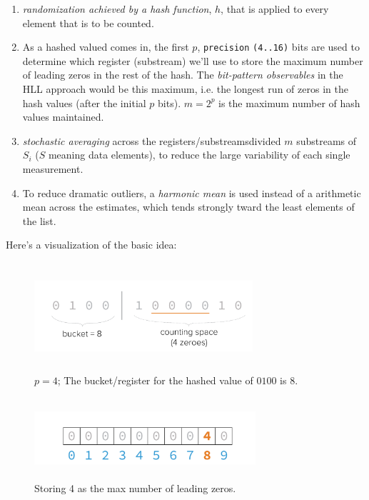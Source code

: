 \documentclass[12pt]{article}
\begin{document}
\begin{enumerate}
\item \textit{randomization achieved by a hash function}, $h$, that is applied
  to every element that is to be counted.
\item As a hashed valued comes in, the first $p$, \texttt{precision}
  \texttt{(4..16)} bits are used to determine which register (substream)
  we'll use to store the maximum number of leading zeros in the rest of the
  hash. The \textit{bit-pattern observables} in the HLL approach would be this
  maximum, i.e. the longest run of zeros in the hash values (after the initial
  $p$ bits). $m = 2^p$ is the maximum number of hash values maintained.
\item \textit{stochastic averaging} across the
  registers/substreams\textemdash divided $m$ substreams of $S_i$
  ($S$ meaning data elements), to reduce the large variability of each single
  measurement.
\item To reduce dramatic outliers, a \textit{harmonic mean} is used instead of
  a arithmetic mean across the estimates, which tends strongly tward the least
  elements of the list\cite{Harmonic-mean:Online}.
\end{enumerate}

Here's a visualization of the basic idea\cite{Kiip:Online}:

\begin{figure}[H]
\centering
\includegraphics[width=8.1cm, height=4cm]{bucket-run}
\caption{$p=4$; The bucket/register for the hashed value of $0100$ is $8$.}
\label{figurebucketrun}
\end{figure}

\begin{figure}[H]
\centering
\includegraphics[width=8.2cm, height=3cm]{register-store}
\caption{Storing 4 as the max number of leading zeros.}
\label{figurestoreregister}
\end{figure}
\end{document}
